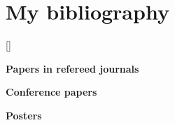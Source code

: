 \documentclass[a4paper,10pt]{article} %
\begin{document}
\section{My bibliography}

{\begin{itemize}
{\setlength{\leftmargin}{\bibhang}%
\setlength{\itemindent}{-\leftmargin}%
\setlength{\itemsep}{\bibitemsep}%
\setlength{\parsep}{\bibparsep}}}
{\end{itemize}}
{\item}

[\bibname]{ }

\nocite{*}

{\bf Papers in refereed journals}
\printbibliography[type=article]

{\bf Conference papers}
\printbibliography[type=inproceedings]

{\bf Posters}
\end{document}
